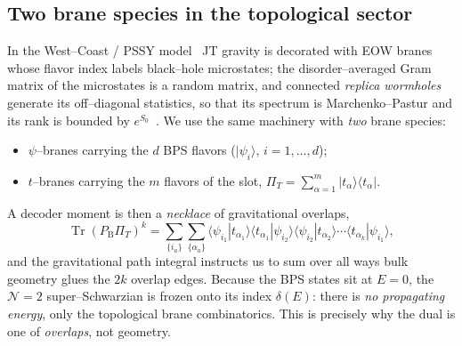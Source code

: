 \documentclass[11pt]{article}
\newcommand{\Tr}{\operatorname{Tr}}
\newcommand{\ket}[1]{\lvert #1\rangle}
\newcommand{\bra}[1]{\langle #1\rvert}
\newcommand{\brak}[2]{\langle #1 | #2\rangle}
\newcommand{\PB}{P_{\mathrm B}}
\newcommand{\PiT}{\Pi_T}
\newif\ifpedagogical
\newcommand{\ped}[1]{\ifpedagogical\par\smallskip{\small\color{pedcol}%
  \leftskip=1.4em\rightskip=1.4em\noindent$\triangleright$~\textit{Plain-language aside.}~#1\par}%
  \par\smallskip\fi}
\begin{document}
\subsection{Two brane species in the topological sector}
In the West--Coast / PSSY model~\cite{PSSY} JT gravity is decorated with EOW branes whose flavor
index labels black--hole microstates; the disorder--averaged Gram matrix of the microstates is a
random matrix, and connected \emph{replica wormholes} generate its off--diagonal statistics, so
that its spectrum is Marchenko--Pastur and its rank is bounded by
$e^{S_0}$~\cite{MP,DistinguishMicro}. We use the same machinery with \emph{two} brane species:
\begin{itemize}
\itemsep2pt
\item $\psi$--branes carrying the $d$ BPS flavors ($\ket{\psi_i}$, $i=1,\dots,d$);
\item $t$--branes carrying the $m$ flavors of the slot, $\PiT=\sum_{\alpha=1}^m\ket{t_\alpha}\bra{t_\alpha}$.
\end{itemize}
\ped{An ``end--of--the--world (EOW) brane'' is a boundary condition where the 2d geometry simply
ends, carrying a label (``flavor'')---here, which BPS state or which slot state. In PSSY they encode
black--hole microstates. The key rule (made precise in \S\ref{sec:action}) is that a brane
conserves its flavor along its length, so summing over the flavor around a closed brane loop just
counts the states: $d$ for a $\psi$--loop, $m$ for a $t$--loop.}
A decoder moment is then a \emph{necklace} of gravitational overlaps,
\begin{equation}
  \Tr(\PB\PiT)^k
  =\sum_{\{i_a\}}\sum_{\{\alpha_a\}}
  \brak{\psi_{i_1}}{t_{\alpha_1}}\!\brak{t_{\alpha_1}}{\psi_{i_2}}\!
  \brak{\psi_{i_2}}{t_{\alpha_2}}\cdots\brak{t_{\alpha_k}}{\psi_{i_1}} ,
  \label{eq:necklace}
\end{equation}
and the gravitational path integral instructs us to sum over all ways bulk geometry glues the
$2k$ overlap edges. Because the BPS states sit at $E=0$, the $\mathcal N{=}2$ super--Schwarzian is
frozen onto its index $\delta(E)$: there is \emph{no propagating energy}, only the topological
brane combinatorics. This is precisely why the dual is one of \emph{overlaps}, not geometry.
\end{document}
